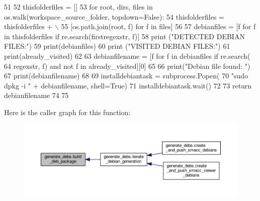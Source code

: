 \begin{DoxyCode}
51 
52     thisfolderfiles = []
53     \textcolor{keywordflow}{for} root, dirs, files \textcolor{keywordflow}{in} os.walk(workspace\_source\_folder, topdown=\textcolor{keyword}{False}):
54         thisfolderfiles = thisfolderfiles + \(\backslash\)
55             [os.path.join(root, f) \textcolor{keywordflow}{for} f \textcolor{keywordflow}{in} files]
56 
57     debianfiles = [f \textcolor{keywordflow}{for} f \textcolor{keywordflow}{in} thisfolderfiles \textcolor{keywordflow}{if} re.search(firstregexstr, f)]
58     \textcolor{keywordflow}{print} (\textcolor{stringliteral}{"DETECTED DEBIAN FILES:"})
59     print(debianfiles)
60     \textcolor{keywordflow}{print} (\textcolor{stringliteral}{"VISITED DEBIAN FILES:"})
61     print(already\_visited)
62 
63     debianfilename = [f \textcolor{keywordflow}{for} f \textcolor{keywordflow}{in} debianfiles \textcolor{keywordflow}{if} re.search(
64         regexstr, f) \textcolor{keywordflow}{and} \textcolor{keywordflow}{not} f \textcolor{keywordflow}{in} already\_visited][0]
65 
66     print(\textcolor{stringliteral}{"Debian file found: "})
67     print(debianfilename)
68 
69     installdebiantask = subprocess.Popen(
70         \textcolor{stringliteral}{"sudo dpkg -i "} + debianfilename, shell=\textcolor{keyword}{True})
71     installdebiantask.wait()
72 
73     \textcolor{keywordflow}{return} debianfilename
74 
75 
\end{DoxyCode}


Here is the caller graph for this function\+:\nopagebreak
\begin{figure}[H]
\begin{center}
\leavevmode
\includegraphics[width=350pt]{namespacegenerate__debs_aa70c3f4917ddc57b13eaed8501f571a8_icgraph}
\end{center}
\end{figure}


